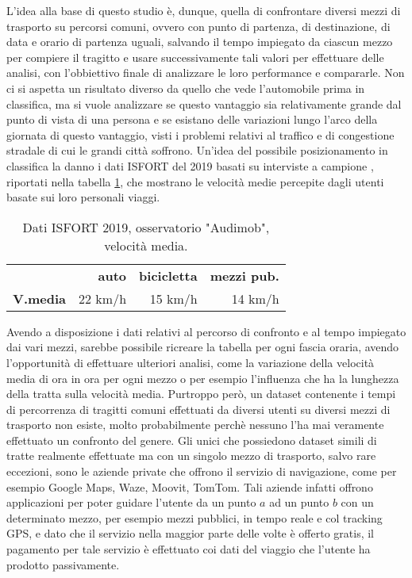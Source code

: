 L'idea alla base di questo studio è, dunque, quella di confrontare diversi mezzi di trasporto su percorsi comuni, ovvero con punto di partenza, di destinazione, di data e orario di partenza uguali, salvando il tempo impiegato da ciascun mezzo per compiere il tragitto e usare successivamente tali valori per effettuare delle analisi, con l'obbiettivo finale di analizzare le loro performance e compararle. Non ci si aspetta un risultato diverso da quello che vede l'automobile prima in classifica, ma si vuole analizzare se questo vantaggio sia relativamente grande dal punto di vista di una persona e se esistano delle variazioni lungo l'arco della giornata di questo vantaggio, visti i problemi relativi al traffico e di congestione stradale di cui le grandi città soffrono. Un'idea del possibile posizionamento in classifica la danno i dati ISFORT del 2019 basati su interviste a campione \cite{isfortaudimob}, riportati nella tabella \ref{table:9}, che mostrano le velocità medie percepite dagli utenti basate sui loro personali viaggi.

\begin{table}[H]
	\centering
	\begin{tabular}{ | l  r  r r | }
		\hline
		& \textbf{auto} & \textbf{bicicletta} & \textbf{mezzi pub.} \\
		\textbf{V.media} & 22 km/h & 15 km/h & 14 km/h \\
		\hline
	\end{tabular}
	\caption{Dati ISFORT 2019, osservatorio "Audimob", velocità media.}
	\label{table:9}
\end{table}

Avendo a disposizione i dati relativi al percorso di confronto e al tempo impiegato dai vari mezzi, sarebbe possibile ricreare la tabella per ogni fascia oraria, avendo l'opportunità di effettuare ulteriori analisi, come la variazione della velocità media di ora in ora per ogni mezzo o per esempio l'influenza che ha la lunghezza della tratta sulla velocità media. Purtroppo però, un dataset contenente i tempi di percorrenza di tragitti comuni effettuati da diversi utenti su diversi mezzi di trasporto non esiste, molto probabilmente perchè nessuno l'ha mai veramente effettuato un confronto del genere. Gli unici che possiedono dataset simili di tratte realmente effettuate ma con un singolo mezzo di trasporto, salvo rare eccezioni, sono le aziende private che offrono il servizio di navigazione, come per esempio Google Maps, Waze, Moovit, TomTom. Tali aziende infatti offrono applicazioni per poter guidare l'utente da un punto $a$ ad un punto $b$ con un determinato mezzo, per esempio mezzi pubblici, in tempo reale e col tracking GPS, e dato che il servizio nella maggior parte delle volte è offerto gratis, il pagamento per tale servizio è effettuato coi dati del viaggio che l'utente ha prodotto passivamente.


